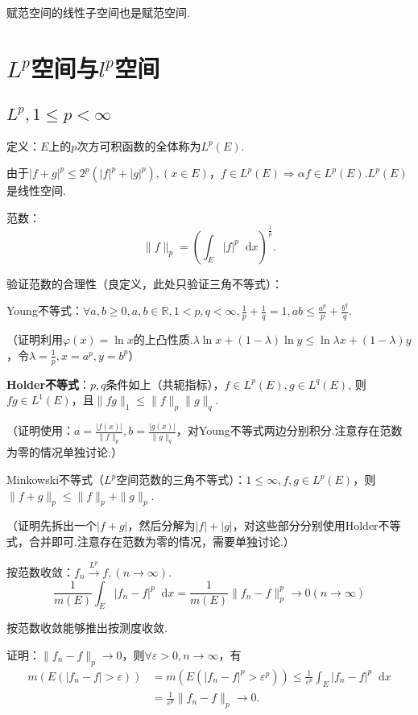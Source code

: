\documentclass[bwprint, withoutpreface]{cumcmthesis}
\newcommand*{\dif}{\mathop{}\!\mathrm{d}}
\newcommand*{\nnorm}[2]{\| #1 \|_{#2}}
\begin{document}
赋范空间的线性子空间也是赋范空间.

\section{$L^p$空间与$l^p$空间}
\subsection{$L^p, 1 \leqslant p < \infty$}
定义：$E$上的$p$次方可积函数的全体称为$L^p(E)$.

由于$|f + g|^p \leqslant 2^p(|f|^p + |g|^p), (x \in E)$，$f \in L^p(E) \Rightarrow \alpha f \in L^p(E)$.$L^p(E)$是线性空间.

范数：\[\nnorm{f}{p} = (\int_E |f|^p \dif x)^\frac{1}{p}.\]

验证范数的合理性（良定义，此处只验证三角不等式）：

Young不等式：$\forall a, b \geqslant 0, a, b \in \mathbb{R}, 1 < p, q < \infty, \frac{1}{p} + \frac{1}{q} = 1, ab \leqslant \frac{a^p}{p} + \frac{b^q}{q}$.

（证明利用$\varphi(x) = \ln{x}$的上凸性质.$\lambda \ln{x} + (1 - \lambda)\ln{y} \leqslant \ln{\lambda x + (1 - \lambda) y}$，令$\lambda = \frac{1}{p}, x = a^p, y = b^p$）

\textbf{Holder不等式}：$p, q$条件如上（共轭指标），$f \in L^p(E), g \in L^q(E)$, 则$fg \in L^1(E)$，且$\nnorm{fg}{1} \leqslant \nnorm{f}{p}\nnorm{g}{q}$.

（证明使用：$a = \frac{|f(x)|}{\nnorm{f}{p}}, b = \frac{|g(x)|}{\nnorm{g}{q}}$，对Young不等式两边分别积分.注意存在范数为零的情况单独讨论.）

Minkowski不等式（$L^p$空间范数的三角不等式）：$1 \leqslant \infty, f, g \in L^p(E)$，则$\nnorm{f + g}{p} \leqslant \nnorm{f}{p} + \nnorm{g}{p}$.

（证明先拆出一个$|f + g|$，然后分解为$|f| + |g|$，对这些部分分别使用Holder不等式，合并即可.注意存在范数为零的情况，需要单独讨论.）

按范数收敛：$f_n \stackrel{L^p}{\longrightarrow} f, (n \to \infty)$.\[\frac{1}{m(E)}\int_E |f_n - f|^p \dif x = \frac{1}{m(E)} \nnorm{f_n - f}{p}^p \to 0 (n \to \infty)\]

按范数收敛能够推出按测度收敛.

证明：$\nnorm{f_n - f}{p} \to 0$，则$\forall \varepsilon > 0, n \to \infty$，有
\begin{align*}
	m(E(|f_n - f| > \varepsilon)) & = m(E(|f_n - f|^p > \varepsilon^p)) \leqslant \frac{1}{\varepsilon^p} \int_{E} |f_n - f|^p \dif x \\
								  & = \frac{1}{\varepsilon^p} \nnorm{f_n - f}{p} \to 0.
\end{align*}
\end{document}
